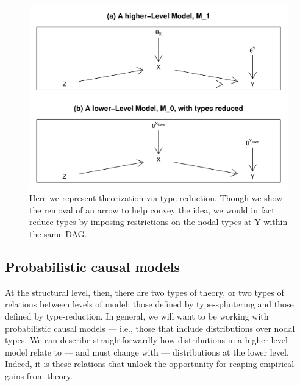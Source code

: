 \documentclass[
  12pt,
]{book}
\begin{document}
\begin{figure}

{\centering \includegraphics[width=0.8\linewidth]{ii_files/figure-latex/Highlowreduce-1} 

}

\caption{Here we represent theorization via type-reduction. Though we show the removal of an arrow to help convey the idea, we would in fact reduce types by imposing restrictions on the nodal types at Y within the same DAG.}\label{fig:Highlowreduce}
\end{figure}

\hypertarget{probabilistic-causal-models}{%
\subsection{Probabilistic causal models}\label{probabilistic-causal-models}}

At the structural level, then, there are two types of theory, or two types of relations between levels of model: those defined by type-splintering and those defined by type-reduction. In general, we will want to be working with probabilistic causal models --- i.e., those that include distributions over nodal types. We can describe straightforwardly how distributions in a higher-level model relate to --- and must change with --- distributions at the lower level. Indeed, it is these relations that unlock the opportunity for reaping empirical gains from theory.
\end{document}

